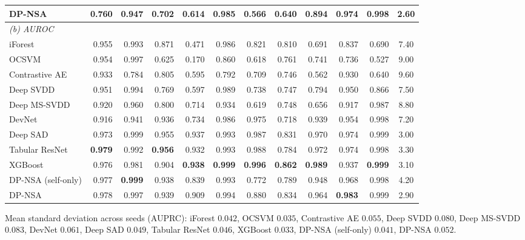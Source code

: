 \begin{table}[!htbp]
\begin{tabular}{lrrrrrrrrrrc}
DP-NSA & 0.760 & 0.947 & \textbf{0.702} & 0.614 & 0.985 & 0.566 & \textbf{0.640} & 0.894 & \textbf{0.974} & 0.998 & 2.60 \\
\midrule
\multicolumn{12}{l}{\textit{(b) AUROC}} \\
\midrule
iForest & 0.955 & 0.993 & 0.871 & 0.471 & 0.986 & 0.821 & 0.810 & 0.691 & 0.837 & 0.690 & 7.40 \\
OCSVM & 0.954 & 0.997 & 0.625 & 0.170 & 0.860 & 0.618 & 0.761 & 0.741 & 0.736 & 0.527 & 9.00 \\
Contrastive AE & 0.933 & 0.784 & 0.805 & 0.595 & 0.792 & 0.709 & 0.746 & 0.562 & 0.930 & 0.640 & 9.60 \\
Deep SVDD & 0.951 & 0.994 & 0.769 & 0.597 & 0.989 & 0.738 & 0.747 & 0.794 & 0.950 & 0.866 & 7.50 \\
Deep MS-SVDD & 0.920 & 0.960 & 0.800 & 0.714 & 0.934 & 0.619 & 0.748 & 0.656 & 0.917 & 0.987 & 8.80 \\
DevNet & 0.916 & 0.941 & 0.936 & 0.734 & 0.986 & 0.975 & 0.718 & 0.939 & 0.954 & 0.998 & 7.20 \\
Deep SAD & 0.973 & 0.999 & 0.955 & 0.937 & 0.993 & 0.987 & 0.831 & 0.970 & 0.974 & 0.999 & 3.00 \\
Tabular ResNet & \textbf{0.979} & 0.992 & \textbf{0.956} & 0.932 & 0.993 & 0.988 & 0.784 & 0.972 & 0.974 & 0.998 & 3.30 \\
XGBoost & 0.976 & 0.981 & 0.904 & \textbf{0.938} & \textbf{0.999} & \textbf{0.996} & \textbf{0.862} & \textbf{0.989} & 0.937 & \textbf{0.999} & 3.10 \\
DP-NSA (self-only) & 0.977 & \textbf{0.999} & 0.938 & 0.839 & 0.993 & 0.772 & 0.789 & 0.948 & 0.968 & 0.998 & 4.20 \\
DP-NSA & 0.978 & 0.997 & 0.939 & 0.909 & 0.994 & 0.880 & 0.834 & 0.964 & \textbf{0.983} & 0.999 & 2.90 \\
\bottomrule
\end{tabular}

\vspace{0.4em}
{\footnotesize Mean standard deviation across seeds (AUPRC): iForest $0.042$, OCSVM $0.035$, Contrastive AE $0.055$, Deep SVDD $0.080$, Deep MS-SVDD $0.083$, DevNet $0.061$, Deep SAD $0.049$, Tabular ResNet $0.046$, XGBoost $0.033$, DP-NSA (self-only) $0.041$, DP-NSA $0.052$.}
\end{table}
